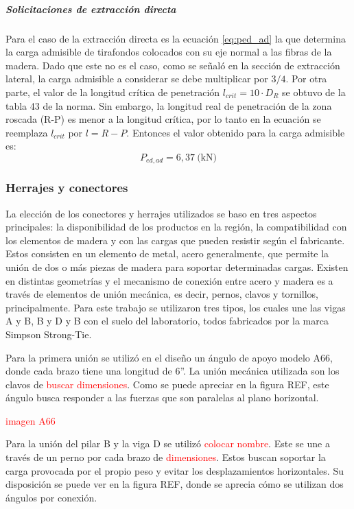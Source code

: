 \subparagraph{Solicitaciones de extracción directa}
Para el caso de la extracción directa es la ecuación \ref{eq:ped_ad} la que determina la carga admisible de tirafondos colocados con su eje normal a las fibras de la madera. Dado que este no es el caso, como se señaló en la sección de extracción lateral, la carga admisible a considerar se debe multiplicar por $3/4$. Por otra parte, el valor de la longitud crítica de penetración $l_{crit}=10\cdot D_R$ se obtuvo de la tabla 43 de la norma. Sin embargo, la longitud real de penetración de la zona roscada (R-P) es menor a la longitud crítica, por lo tanto en la ecuación se reemplaza $l_{crit}$ por $l = R-P$. Entonces el valor obtenido para la carga admisible es:
\begin{equation}
	P_{ed,ad} = 6,37 \: \text{(kN)}
\end{equation} 

\subsubsection{Herrajes y conectores}
La elección de los conectores y herrajes utilizados se baso en tres aspectos principales: la disponibilidad de los productos en la región, la compatibilidad con los elementos de madera y con las cargas que pueden resistir según el fabricante. Estos consisten en un elemento de metal, acero generalmente, que permite la unión de dos o más piezas de madera para soportar determinadas cargas. Existen en distintas geometrías y el mecanismo de conexión entre acero y madera es a través de elementos de unión mecánica, es decir, pernos, clavos y tornillos, principalmente. Para este trabajo se utilizaron tres tipos, los cuales une las vigas A y B, B y D y B con el suelo del laboratorio, todos fabricados por la marca Simpson Strong-Tie.

Para la primera unión se utilizó en el diseño un ángulo de apoyo modelo A66, donde cada brazo tiene una longitud de 6''. La unión mecánica utilizada son los clavos de \textcolor{red}{buscar dimensiones}. Como se puede apreciar en la figura REF, este ángulo busca responder a las fuerzas que son paralelas al plano horizontal.

\textcolor{red}{imagen A66}

Para la unión del pilar B y la viga D se utilizó \textcolor{red}{colocar nombre}. Este se une a través de un perno por cada brazo de \textcolor{red}{dimensiones}. Estos buscan soportar la carga provocada por el propio peso y evitar los desplazamientos horizontales. Su disposición se puede ver en la figura REF, donde se aprecia cómo se utilizan dos ángulos por conexión.

